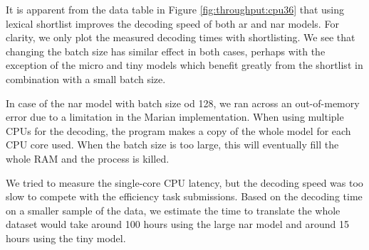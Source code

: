 It is apparent from the data table in Figure \ref{fig:throughput:cpu36} that
using lexical shortlist improves the decoding speed of both \ac{ar} and
\ac{nar} models. For clarity, we only plot the measured decoding times with
shortlisting. We see that changing the batch size has similar effect in both
cases, perhaps with the exception of the micro and tiny models which benefit
greatly from the shortlist in combination with a small batch size.

In case of the \ac{nar} model with batch size od 128, we ran across an
out-of-memory error due to a limitation in the Marian implementation. When
using multiple CPUs for the decoding, the program makes a copy of the whole
model for each CPU core used. When the batch size is too large, this will
eventually fill the whole RAM and the process is killed.

We tried to measure the single-core CPU latency, but the decoding speed was too
slow to compete with the efficiency task submissions. Based on the decoding
time on a smaller sample of the data, we estimate the time to translate the
whole dataset would take around 100 hours using the large \ac{nar} model and
around 15 hours using the tiny model.

